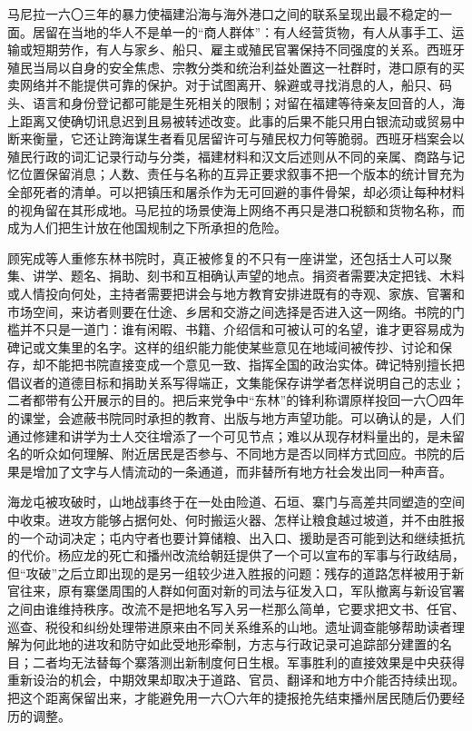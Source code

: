 马尼拉一六〇三年的暴力使福建沿海与海外港口之间的联系呈现出最不稳定的一面。居留在当地的华人不是单一的“商人群体”：有人经营货物，有人从事手工、运输或短期劳作，有人与家乡、船只、雇主或殖民官署保持不同强度的关系。西班牙殖民当局以自身的安全焦虑、宗教分类和统治利益处置这一社群时，港口原有的买卖网络并不能提供可靠的保护。对于试图离开、躲避或寻找消息的人，船只、码头、语言和身份登记都可能是生死相关的限制；对留在福建等待亲友回音的人，海上距离又使确切讯息迟到且易被转述改变。此事的后果不能只用白银流动或贸易中断来衡量，它还让跨海谋生者看见居留许可与殖民权力何等脆弱。西班牙档案会以殖民行政的词汇记录行动与分类，福建材料和汉文后述则从不同的亲属、商路与记忆位置保留消息；人数、责任与名称的互异正要求叙事不把一个版本的统计冒充为全部死者的清单。可以把镇压和屠杀作为无可回避的事件骨架，却必须让每种材料的视角留在其形成地。马尼拉的场景使海上网络不再只是港口税额和货物名称，而成为人们把生计放在他国规制之下所承担的危险。

顾宪成等人重修东林书院时，真正被修复的不只有一座讲堂，还包括士人可以聚集、讲学、题名、捐助、刻书和互相确认声望的地点。捐资者需要决定把钱、木料或人情投向何处，主持者需要把讲会与地方教育安排进既有的寺观、家族、官署和市场空间，来访者则要在仕途、乡居和交游之间选择是否进入这一网络。书院的门槛并不只是一道门：谁有闲暇、书籍、介绍信和可被认可的名望，谁才更容易成为碑记或文集里的名字。这样的组织能力能使某些意见在地域间被传抄、讨论和保存，却不能把书院直接变成一个意见一致、指挥全国的政治实体。碑记特别擅长把倡议者的道德目标和捐助关系写得端正，文集能保存讲学者怎样说明自己的志业；二者都带有公开展示的目的。把后来党争中“东林”的锋利称谓原样投回一六〇四年的课堂，会遮蔽书院同时承担的教育、出版与地方声望功能。可以确认的是，人们通过修建和讲学为士人交往增添了一个可见节点；难以从现存材料量出的，是未留名的听众如何理解、附近居民是否参与、不同地方是否以同样方式回应。书院的后果是增加了文字与人情流动的一条通道，而非替所有地方社会发出同一种声音。

海龙屯被攻破时，山地战事终于在一处由险道、石垣、寨门与高差共同塑造的空间中收束。进攻方能够占据何处、何时搬运火器、怎样让粮食越过坡道，并不由胜报的一个动词决定；屯内守者也要计算储粮、出入口、援助是否可能到达和继续抵抗的代价。杨应龙的死亡和播州改流给朝廷提供了一个可以宣布的军事与行政结局，但“攻破”之后立即出现的是另一组较少进入胜报的问题：残存的道路怎样被用于新官往来，原有寨堡周围的人群如何面对新的司法与征发入口，军队撤离与新设官署之间由谁维持秩序。改流不是把地名写入另一栏那么简单，它要求把文书、任官、巡查、税役和纠纷处理带进原来由不同关系维系的山地。遗址调查能够帮助读者理解为何此地的进攻和防守如此受地形牵制，方志与行政记录可追踪部分建置的名目；二者均无法替每个寨落测出新制度何日生根。军事胜利的直接效果是中央获得重新设治的机会，中期效果却取决于道路、官员、翻译和地方中介能否持续出现。把这个距离保留出来，才能避免用一六〇六年的捷报抢先结束播州居民随后仍要经历的调整。

